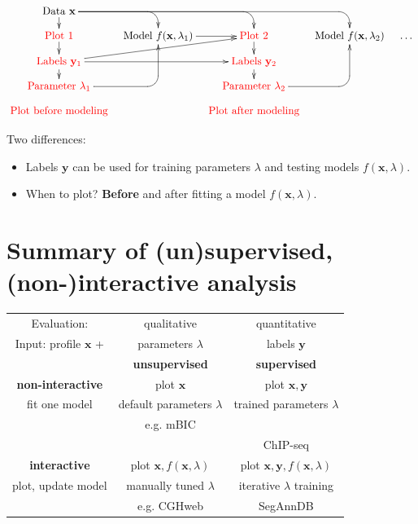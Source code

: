 \documentclass[a4paper,10pt]{article} %
\begin{document}
\begin{displaymath}
  \xymatrix@=0.3cm{
    \text{Data $\mathbf x$}
    \ar `[r] [dr] 
    \ar `r[rr] [drr] 
    \ar `r[rrr] [drrr] 
    \ar [d]
    & \text{ }
    & \text{ }
    & \text{ }
    \\
    \textcolor{red}{\text{Plot 1} }
    \ar [d]
    & 
    \text{Model $f(\mathbf x, \lambda_1)$} 
    \ar [r]
    &
    \textcolor{red}{\text{Plot 2} }
    \ar [d]
    & 
    \text{Model $f(\mathbf x, \lambda_2)$}  & \dots
    \\
    \textcolor{red}{\text{Labels $\mathbf y_1$}       }
    \ar [d]
    \ar [rr]
    \ar [rru]
    &
    &
    \textcolor{red}{\text{Labels $\mathbf y_2$}}
    \ar [d]
    \\
    \textcolor{red}{\text{Parameter $\lambda_1$} }
    \ar `r[ruu] [ruu]
    & \text{ }
    & \textcolor{red}{\text{Parameter $\lambda_2$}}
    \ar `r[ruu] [ruu] \\
    \textcolor{red}{\text{Plot before modeling}} &
    &
    \textcolor{red}{\text{Plot after modeling}} 
  }
\end{displaymath}

Two differences:
\begin{itemize}
\item Labels $\mathbf y$ can be used for training parameters $\lambda$
  and testing models $f(\mathbf x, \lambda)$.
\item When to plot? \textbf{Before} and after fitting a model
  $f(\mathbf x, \lambda)$.
\end{itemize}

\section*{Summary of (un)supervised, (non-)interactive analysis}

  \begin{center}
  \begin{tabular}{c|c|c}
    Evaluation: & qualitative &  quantitative \\
    Input: profile $\mathbf x$ + & parameters $\lambda$ & labels $\mathbf y$ \\
        & \textbf{unsupervised} & \textbf{supervised}\\
    \hline
    \textbf{non-interactive}
    & plot $\mathbf x$ & plot $\mathbf x, \mathbf y$\\
    fit one model
    & default parameters $\lambda$ & trained parameters $\lambda$ \\
    & e.g. mBIC \citep{mBIC} & \citep{HOCKING-penalties, HOCKING-breakpoints}\\
    && ChIP-seq \citep{hocking2014visual}\\
    \hline
    \textbf{interactive}
    & plot $\mathbf x, f(\mathbf x, \lambda)$ 
    & plot $\mathbf x, \mathbf y, f(\mathbf x, \lambda)$\\
    plot, update model 
    & manually tuned $\lambda$ & iterative $\lambda$ training\\
    & e.g. CGHweb \citep{CGHweb}  & SegAnnDB \citet{HOCKING-SegAnnDB}
  \end{tabular}
  \end{center}



\end{document}
